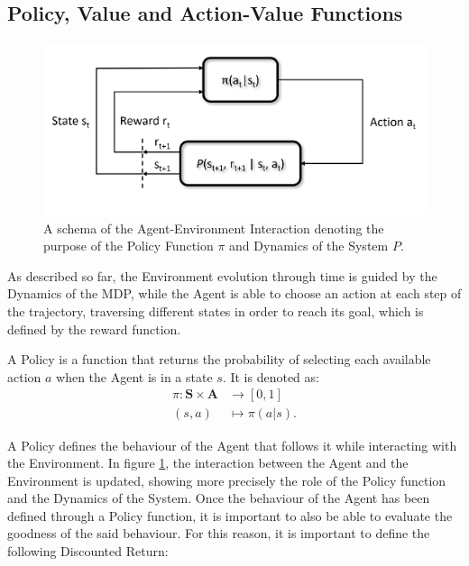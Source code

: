         \subsection{Policy, Value and Action-Value Functions}
            \label{subs:PVQ}
            
            \begin{figure}[t]
                \centering
                \includegraphics[width=14cm, keepaspectratio]{images/mdp/int_schema_def.png}
                \caption{A schema of the Agent-Environment Interaction denoting the purpose of the Policy Function $\pi$ and Dynamics of the System $P$.}
                \label{fig:int_schema_def}
            \end{figure}
            
            As described so far, the Environment evolution through time is guided by the Dynamics of the MDP, while the Agent is able to choose an action at each step of the trajectory, traversing different states in order to reach its goal, which is defined by the reward function. 
            
            \begin{definition}[Policy]
                \label{def:policy}
                A Policy is a function that returns the probability of selecting each available action $a$ when the Agent is in a state $s$. It is denoted as:
                \begin{align*}
                  \pi : \mathbf{S} \times \mathbf{A} &\rightarrow [0, 1]\\
                  (s,a) &\mapsto \pi(a|s).
                \end{align*}
            \end{definition}

            A Policy defines the behaviour of the Agent that follows it while interacting with the Environment. In figure \ref{fig:int_schema_def}, the interaction between the Agent and the Environment is updated, showing more precisely the role of the Policy function and the Dynamics of the System. Once the behaviour of the Agent has been defined through a Policy function, it is important to also be able to evaluate the goodness of the said behaviour. For this reason, it is important to define the following Discounted Return:
            
